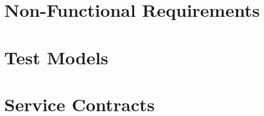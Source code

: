 \documentclass{article}
\begin{document}
\section{Non-Functional Requirements}
	
\clearpage
	
\section{Test Models}
	
\clearpage

\section{Service Contracts}
	
\end{document}
